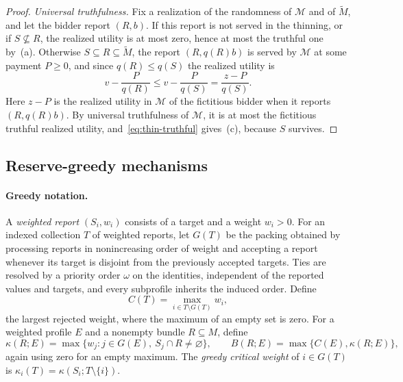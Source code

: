 \documentclass[format=acmsmall, review=false]{acmart}
\begin{document}
\begin{proof}
\emph{Universal truthfulness.} Fix a realization of the
randomness of \(\mathcal M\) and of \(\widetilde M\), and let the
bidder report \((R,b)\). If this report is not served in the
thinning, or if \(S\not\subseteq R\), the realized utility is at
most zero, hence at most the truthful one by~(a). Otherwise
\(S\subseteq R\subseteq\widetilde M\), the report
\((R,q(R)b)\) is served by \(\mathcal M\) at some payment
\(P\ge0\), and since \(q(R)\le q(S)\) the realized utility is
\[
v-\frac{P}{q(R)}\le v-\frac{P}{q(S)}=\frac{z-P}{q(S)}.
\]
Here \(z-P\) is the realized utility in \(\mathcal M\) of the
fictitious bidder when it reports \((R,q(R)b)\). By universal
truthfulness of \(\mathcal M\), it is at most the fictitious
truthful realized utility, and~\eqref{eq:thin-truthful}
gives~(c), because \(S\) survives.
\end{proof}

\subsection{Reserve-greedy mechanisms}
\label{sec:rand-reserve}

\paragraph{Greedy notation.}
A \emph{weighted report} \((S_i,w_i)\) consists of a target and a
weight \(w_i>0\). For an indexed collection \(T\) of weighted
reports, let \(G(T)\) be the packing obtained by processing
reports in nonincreasing order of weight and accepting a report
whenever its target is disjoint from the previously accepted
targets. Ties are resolved by a priority order \(\omega\) on the
identities, independent of the reported values and targets, and
every subprofile inherits the induced order. Define
\[
C(T)=\max_{i\in T\setminus G(T)}w_i,
\]
the largest rejected weight, where the maximum of an empty set is
zero. For a weighted profile \(E\) and a nonempty bundle
\(R\subseteq M\), define
\[
\kappa(R;E)=
\max\bigl\{
w_j:j\in G(E),\
S_j\cap R\ne\varnothing
\bigr\},
\qquad
B(R;E)=\max\{C(E),\kappa(R;E)\},
\]
again using zero for an empty maximum. The \emph{greedy critical
weight} of \(i\in G(T)\) is
\(\kappa_i(T)=\kappa(S_i;T\setminus\{i\})\).
\end{document}
